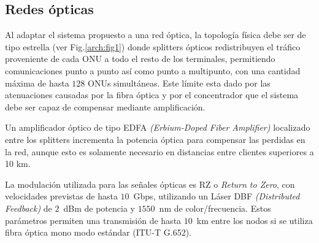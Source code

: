 \subsection{Redes ópticas}






Al adaptar el sistema propuesto a una red óptica, la topología física debe ser de tipo estrella (ver Fig.\ref{arch:fig1}) donde splitters ópticos redistribuyen el tráfico proveniente de cada ONU a todo el resto de los terminales, permitiendo comunicaciones punto a punto así como punto a multipunto, con una cantidad máxima de hasta $128$ ONUs simultáneas. Este límite esta dado por las atenuaciones causadas por la fibra óptica y por el concentrador que el sistema debe ser capaz de compensar mediante amplificación.

Un amplificador óptico de tipo EDFA \textit{(Erbium-Doped Fiber Amplifier)} localizado entre los splitters incrementa la potencia óptica para compensar las perdidas en la red, aunque esto es solamente necesario en distancias entre clientes superiores a 10 km.

La modulación utilizada para las señales ópticas es RZ o \textit{Return to Zero}, con velocidades previstas de hasta $10$~Gbps, utilizando un Láser DBF \textit{(Distributed Feedback)} de $2$~dBm de potencia y $1550$~nm de color/frecuencia. Estos parámetros permiten una transmisión de hasta $10$~km entre los nodos si se utiliza fibra óptica mono modo estándar (ITU-T G.652).

